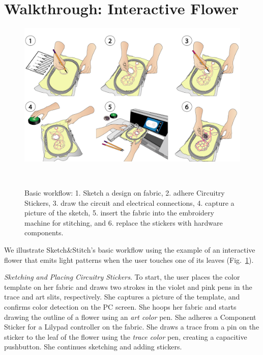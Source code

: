 \documentclass[header.tex]{subfiles}
\begin{document}



\section{Walkthrough: Interactive Flower}
\begin{figure} [t!]
\centering
  \includegraphics[width=0.9\columnwidth]{figures/Walkthrough.png}
  \caption{Basic workflow: 1. Sketch a design on fabric, 2. adhere Circuitry Stickers, 3. draw the circuit and electrical connections, 4. capture a picture of the sketch, 5. insert the fabric into the embroidery machine for stitching, and 6. replace the stickers with hardware components.}~\label{fig:Walkthrough}
  \vspace{-2.2em}
\end{figure}

We illustrate Sketch\&Stitch's basic workflow using the example of an interactive flower that emits light patterns when the user touches one of its leaves (Fig.\ \ref{fig:Walkthrough}). %


\textit{Sketching and Placing Circuitry Stickers}. To start, the user places the color template on her fabric and draws two strokes in the violet and pink pens in the trace and art slits, respectively. She captures a picture of the template, and confirms color detection on the PC screen. She hoops her fabric and starts drawing the outline of a flower using an \textit{art color} pen. She adheres a Component Sticker for a Lilypad controller on the fabric. She draws a trace from a pin on the sticker to the leaf of the flower using the \textit{trace color} pen, creating a capacitive pushbutton. She continues sketching and adding stickers.
\end{document}

